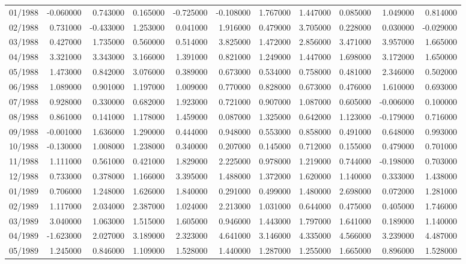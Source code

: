 \begin{tabular}{lrrrrrrrrrr}
01/1988 & -0.060000 & 0.743000 & 0.165000 & -0.725000 & -0.108000 & 1.767000 & 1.447000 & 0.085000 & 1.049000 & 0.814000 \\
02/1988 & 0.731000 & -0.433000 & 1.253000 & 0.041000 & 1.916000 & 0.479000 & 3.705000 & 0.228000 & 0.030000 & -0.029000 \\
03/1988 & 0.427000 & 1.735000 & 0.560000 & 0.514000 & 3.825000 & 1.472000 & 2.856000 & 3.471000 & 3.957000 & 1.665000 \\
04/1988 & 3.321000 & 3.343000 & 3.166000 & 1.391000 & 0.821000 & 1.249000 & 1.447000 & 1.698000 & 3.172000 & 1.650000 \\
05/1988 & 1.473000 & 0.842000 & 3.076000 & 0.389000 & 0.673000 & 0.534000 & 0.758000 & 0.481000 & 2.346000 & 0.502000 \\
06/1988 & 1.089000 & 0.901000 & 1.197000 & 1.009000 & 0.770000 & 0.828000 & 0.673000 & 0.476000 & 1.610000 & 0.693000 \\
07/1988 & 0.928000 & 0.330000 & 0.682000 & 1.923000 & 0.721000 & 0.907000 & 1.087000 & 0.605000 & -0.006000 & 0.100000 \\
08/1988 & 0.861000 & 0.141000 & 1.178000 & 1.459000 & 0.087000 & 1.325000 & 0.642000 & 1.123000 & -0.179000 & 0.716000 \\
09/1988 & -0.001000 & 1.636000 & 1.290000 & 0.444000 & 0.948000 & 0.553000 & 0.858000 & 0.491000 & 0.648000 & 0.993000 \\
10/1988 & -0.130000 & 1.008000 & 1.238000 & 0.340000 & 0.207000 & 0.145000 & 0.712000 & 0.155000 & 0.479000 & 0.701000 \\
11/1988 & 1.111000 & 0.561000 & 0.421000 & 1.829000 & 2.225000 & 0.978000 & 1.219000 & 0.744000 & -0.198000 & 0.703000 \\
12/1988 & 0.733000 & 0.378000 & 1.166000 & 3.395000 & 1.488000 & 1.372000 & 1.620000 & 1.140000 & 0.333000 & 1.438000 \\
01/1989 & 0.706000 & 1.248000 & 1.626000 & 1.840000 & 0.291000 & 0.499000 & 1.480000 & 2.698000 & 0.072000 & 1.281000 \\
02/1989 & 1.117000 & 2.034000 & 2.387000 & 1.024000 & 2.213000 & 1.031000 & 0.644000 & 0.475000 & 0.405000 & 1.746000 \\
03/1989 & 3.040000 & 1.063000 & 1.515000 & 1.605000 & 0.946000 & 1.443000 & 1.797000 & 1.641000 & 0.189000 & 1.140000 \\
04/1989 & -1.623000 & 2.027000 & 3.189000 & 2.323000 & 4.641000 & 3.146000 & 4.335000 & 4.566000 & 3.239000 & 4.487000 \\
05/1989 & 1.245000 & 0.846000 & 1.109000 & 1.528000 & 1.440000 & 1.287000 & 1.255000 & 1.665000 & 0.896000 & 1.528000 \\

\end{tabular}
